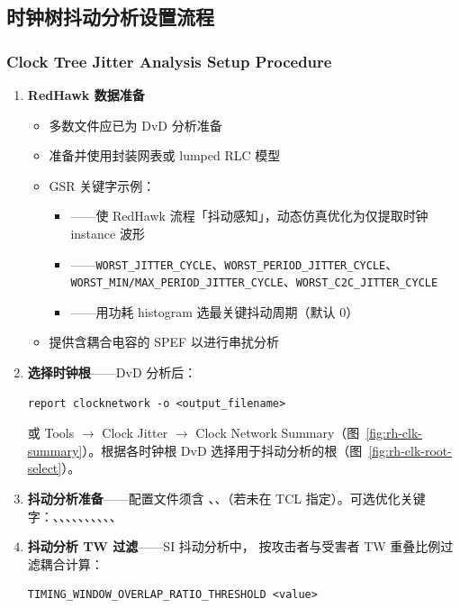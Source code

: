 \subsection{时钟树抖动分析设置流程}
\subsubsection*{Clock Tree Jitter Analysis Setup Procedure}

\begin{enumerate}
  \item \textbf{RedHawk 数据准备}
  \begin{itemize}
    \item 多数文件应已为 DvD 分析准备
    \item 准备并使用封装网表或 lumped RLC 模型
    \item GSR 关键字示例：
    \begin{itemize}
      \item {}——使 RedHawk 流程「抖动感知」，动态仿真优化为仅提取时钟 instance 波形
      \item {}——\texttt{WORST\_JITTER\_CYCLE}、\texttt{WORST\_PERIOD\_JITTER\_CYCLE}、\texttt{WORST\_MIN/MAX\_PERIOD\_JITTER\_CYCLE}、\texttt{WORST\_C2C\_JITTER\_CYCLE}
      \item {}——用功耗 histogram 选最关键抖动周期（默认 0）
    \end{itemize}
    \item 提供含耦合电容的 SPEF 以进行串扰分析
  \end{itemize}
  \item \textbf{选择时钟根}——DvD 分析后：
\begin{lstlisting}
report clocknetwork -o <output_filename>
\end{lstlisting}
  或 Tools $\rightarrow$ Clock Jitter $\rightarrow$ Clock Network Summary（图~\ref{fig:rh-clk-summary}）。根据各时钟根 DvD 选择用于抖动分析的根（图~\ref{fig:rh-clk-root-select}）。
  \item \textbf{抖动分析准备}——配置文件须含 、、（若未在 TCL 指定）。可选优化关键字：、、、、、、、、、、
  \item \textbf{抖动分析 TW 过滤}——SI 抖动分析中， 按攻击者与受害者 TW 重叠比例过滤耦合计算：
\begin{lstlisting}
TIMING_WINDOW_OVERLAP_RATIO_THRESHOLD <value>
\end{lstlisting}
\end{enumerate}

